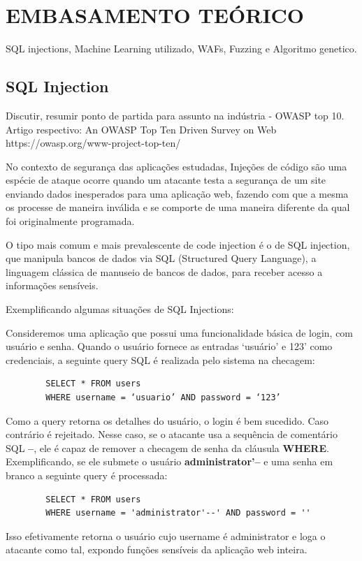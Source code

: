 \chapter{EMBASAMENTO TEÓRICO}
\label{chp:capitulo3}


SQL injections, Machine Learning utilizado, WAFs, Fuzzing e Algoritmo genetico.

\section{SQL Injection}
Discutir, resumir ponto de partida para assunto na indústria - OWASP top 10.
Artigo respectivo: An OWASP Top Ten Driven Survey on Web
https://owasp.org/www-project-top-ten/

No contexto de segurança das aplicações estudadas, Injeções de código são uma espécie de ataque ocorre quando um atacante testa a segurança de um site enviando dados inesperados para uma aplicação web, fazendo com que a mesma os processe de maneira inválida e se comporte de uma maneira diferente da qual foi originalmente programada. 

O tipo mais comum e mais prevalescente de code injection é o de SQL injection, que manipula bancos de dados via SQL (Structured Query Language), a linguagem clássica de manuseio de bancos de dados, para receber acesso a informações sensíveis.

Exemplificando algumas situações de SQL Injections:

\begin{alineas}
    \item 
    Consideremos uma aplicação que possui uma funcionalidade básica de login, com usuário e senha. Quando o usuário fornece as entradas ‘usuário’ e 123’ como credenciais, a seguinte query SQL é realizada pelo sistema na checagem:
    
    \begin{verbatim}
        SELECT * FROM users 
        WHERE username = ‘usuario’ AND password = ‘123’
    \end{verbatim}
    
    Como a query retorna os detalhes do usuário, o login é bem sucedido. Caso contrário  é rejeitado. Nesse caso, se o atacante usa a sequência de comentário SQL \textbf{--}, ele é capaz de remover a checagem de senha da cláusula \textbf{WHERE}. Exemplificando, se ele submete o usuário \textbf{administrator’--} e uma senha em branco a seguinte query é processada:
    
    \begin{verbatim}
        SELECT * FROM users 
        WHERE username = 'administrator'--' AND password = '' 
    \end{verbatim}
    
    Isso efetivamente retorna o usuário cujo username é administrator e loga o atacante como tal, expondo funções sensíveis da aplicação web inteira.


    
\end{alineas}

